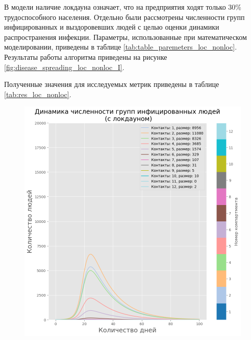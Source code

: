 \documentclass[14pt,a4paper]{article}
\begin{document}
В модели наличие локдауна означает, что на предприятия ходят только 30\% трудоспособного населения. Отдельно были рассмотрены численности групп инфицированных и выздоровевших людей с целью оценки динамики распространения инфекции. Параметры, использованные при математическом моделировании, приведены в таблице \ref{tab:table_paremeters_loc_nonloc}. Результаты работы алгоритма приведены на рисунке \ref{fig:disease_spreading_loc_nonloc_I}.

Полученные значения для исследуемых метрик приведены в таблице \ref{tab:res_loc_nonloc}.


\begin{figure}[h!]
	\begin{minipage}{0.5\textwidth}
		\centering
		\includegraphics[width=\linewidth]{img/sir_model_lockdown_urban_I_new.png}
	\end{minipage}
	\begin{minipage}{0.5\textwidth}
		\centering

\end{minipage}
\end{figure}
\end{document}
